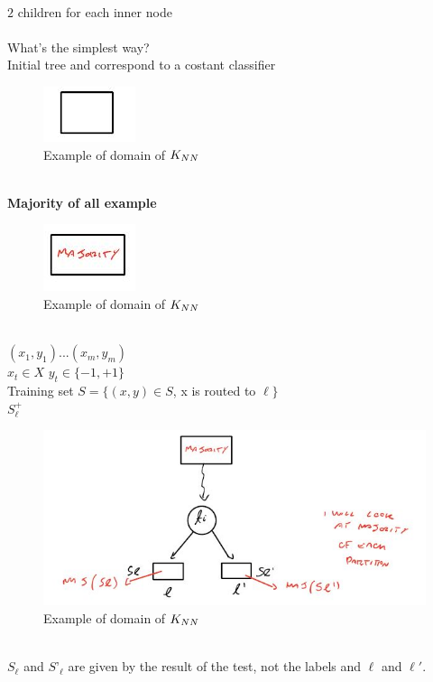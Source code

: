 \documentclass[../main.tex]{subfiles}
\begin{document}
\\ $2$ children for each inner node
\\\\
What's the simplest way?\\
Initial tree and correspond to a costant classifier
\\
\begin{figure}[h]
    \centering
    \includegraphics[width=0.2\linewidth]{../img/lez4-img4.JPG}
    \caption{Example of domain of $K_{NN}$}
\end{figure}\\
\textbf{Majority of all example}
\\
\begin{figure}[h]
    \centering
    \includegraphics[width=0.2\linewidth]{../img/lez4-img5.JPG}
    \caption{Example of domain of $K_{NN}$}
\end{figure}\\
$(x_1, y_1) ... (x_m, y_m)$ \\
$ x_t \in X$ \qquad $ y_t \in \{-1,+1\}$\\
Training set $S = \{ (x,y) \in S$, x is routed to $\ell\}$\\
$S_{\ell}^+$ 
\\
\begin{figure}[h]
    \centering
    \includegraphics[width=0.8\linewidth]{../img/lez4-img6.JPG}
    \caption{Example of domain of $K_{NN}$}
\end{figure}\\
$ S_{\ell}$ and $ S’_{\ell}$ are given by the result of the test, not the labels  and $\ell$ and $\ell'$.\\
\end{document}

